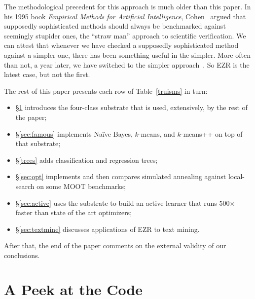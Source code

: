 \documentclass[AMA,STIX2COL]{WileyNJDv5}
\begin{document}
The methodological precedent for this approach is much older than this paper.
In his 1995 book {\em
Empirical Methods for Artificial Intelligence},
Cohen~\cite{cohen1995empirical} argued that supposedly
sophisticated methods should always be benchmarked against
seemingly stupider ones, the ``straw man'' approach to
scientific verification. We can attest that whenever we have
checked a supposedly sophisticated method against a simpler one,
there has been something useful in the simpler. More often than
not, a year later, we have switched to the simpler
approach~\cite{Nair17a,agrawal2019dodge,tantithamthavorn2016automated,
fu2016tuning}. So EZR is the latest case, but not the first.
 
The rest of this paper presents each row of
Table~\ref{truisms} in turn:
\begin{itemize}
\item
\S\ref{sec:peek} introduces the four-class substrate that is used, extensively, by the rest of the paper;
\item
\S\ref{sec:famous} implements Naïve Bayes, $k$-means, and
$k$-means++ on top of that substrate;
\item
\S\ref{trees} adds classification and regression trees;
\item 
\S\ref{sec:opt} implements and then compares simulated annealing against
local-search   on some MOOT benchmarks;
\item
\S\ref{sec:active} uses the substrate to build an active learner that runs
500$\times$ faster than   state of the art optimizers;
\item
 \S\ref{sec:textmine} discusses applications of EZR to text mining.
 \end{itemize}
 After that, the end of the paper comments on the external validity of
 our conclusions.   
\section{A Peek at the Code}\label{sec:peek}
\end{document}
